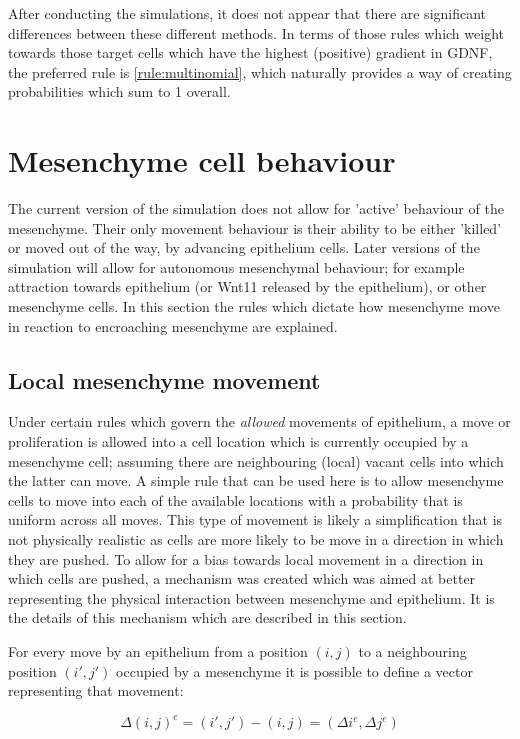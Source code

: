 \documentclass[pdftex,10pt,a4paper]{article}
\begin{document}
After conducting the simulations, it does not appear that there are significant differences between these different methods. In terms of those rules which weight towards those target cells which have the highest (positive) gradient in 
GDNF, the preferred rule is \ref{rule:multinomial}, which naturally provides a way of creating probabilities which sum to 1 overall.


\section{Mesenchyme cell behaviour}
The current version of the simulation does not allow for 'active' behaviour of the mesenchyme. Their only movement behaviour is their ability to be either 'killed' or moved out of the way, by advancing epithelium cells. Later versions of the simulation will allow for autonomous mesenchymal behaviour; for example attraction towards epithelium (or Wnt11 released by the epithelium), or other mesenchyme cells. In this section the rules which dictate how mesenchyme move in reaction to encroaching mesenchyme are explained.

\subsection{Local mesenchyme movement}\label{sec:weighted}
Under certain rules which govern the \textit{allowed} movements of epithelium, a move or proliferation is allowed into a cell location which is currently occupied by a mesenchyme cell; assuming there are neighbouring (local) vacant cells into which the latter can move. A simple rule that can be used here is to allow mesenchyme cells to move into each of the available locations with a probability that is uniform across all moves. This type of movement is likely a simplification that is not physically realistic as cells are more likely to be move in a direction in which they are pushed. To allow for a bias towards local movement in a direction in which cells are pushed, a mechanism was created which was aimed at better representing the physical interaction between mesenchyme and epithelium. It is the details of this mechanism which are described in this section.

For every move by an epithelium from a position $(i,j)$ to a neighbouring position $(i',j')$ occupied by a mesenchyme it is possible to define a vector representing that movement:

\begin{equation}\label{eq:delta_move}
\Delta(i,j)^{e} = (i',j') - (i,j) = (\Delta i^{e}, \Delta j^{e})
\end{equation}
\end{document}
